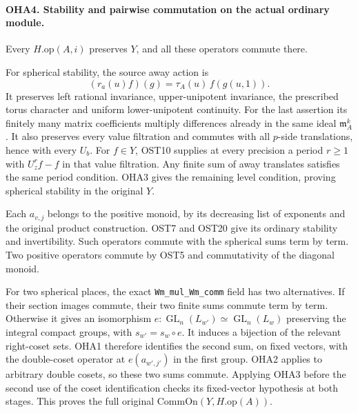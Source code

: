 \documentclass[11pt,a4paper]{article}
\numberwithin{equation}{section}
\theoremstyle{remark}\newtheorem{remark}[theorem]{Remark}
\begin{document}
\paragraph{OHA4. Stability and pairwise commutation on the actual ordinary module.}
\label{claim:OHA4}
Every \(H.\mathrm{op}(A,\allowbreak{} i)\) preserves \(Y\), and all these
operators commute there.

For spherical stability, the source away action is
\[
       (r_a(u)f)(g)=\tau_A(u)\,\allowbreak{} f(g(u,1)).
\]
It preserves left rational invariance, upper-unipotent invariance,
the prescribed torus character and uniform lower-unipotent
continuity. For the last assertion its finitely many matrix
coefficients multiply differences already in the same ideal
\(\mathfrak m_A^k\). It also preserves every value filtration
and commutes with all \(p\)-side translations, hence with every
\(U_b\). For \(f\in Y\), OST10 supplies at every precision a
period \(r\ge1\) with \(U_z^rf-f\) in that value filtration.
Any finite sum of away translates satisfies the same period
condition. OHA3 gives the remaining level condition, proving
spherical stability in the original \(Y\).

Each \(a_{v,\allowbreak{} j}\) belongs to the positive monoid, by its decreasing
list of exponents and the original product construction.
OST7 and OST20 give its ordinary stability and invertibility.
Such operators commute with the spherical sums term by term.
Two positive operators commute by OST5 and commutativity of the
diagonal monoid.

For two spherical places, the exact \texttt{Wm\_\allowbreak mul\_\allowbreak Wm\_\allowbreak comm}
field has two alternatives. If their section images commute,
their two finite sums commute term by term. Otherwise it gives
an isomorphism \(e:\operatorname{GL}_n(L_{w'})
\simeq\operatorname{GL}_n(L_w)\) preserving the integral compact
groups, with \(s_{w'}=s_w\circ e\). It induces a bijection of
the relevant right-coset sets. OHA1 therefore identifies the
second sum, on fixed vectors, with the double-coset operator
at \(e(a_{w',\allowbreak{} j'})\) in the first group. OHA2 applies to arbitrary
double cosets, so these two sums commute. Applying OHA3 before
the second use of the coset identification checks its fixed-vector
hypothesis at both stages. This proves the full original
\(\mathrm{CommOn}(Y,\allowbreak{} H.\mathrm{op}(A))\).

\end{document}
